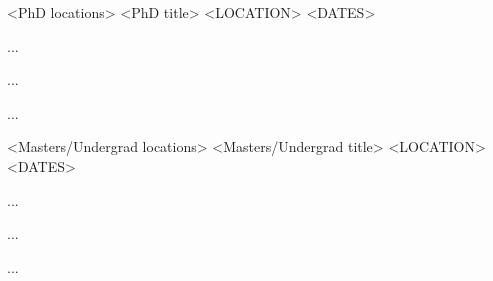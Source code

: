 


\begin{cventries}


\cventry
{<PhD locations>} %
{<PhD title>} %
{<LOCATION>} %
{<DATES>} %
{ %
\begin{cvitems}
\item{ ...}
\item{ ...}
\item{ ...}
\end{cvitems}
}


\cventry
{<Masters/Undergrad locations>} %
{<Masters/Undergrad title>} %
{<LOCATION>} %
{<DATES>} %
{ %
\begin{cvitems}
\item{ ...}
\item{ ...}
\item{ ...}
\end{cvitems}
}


\end{cventries}